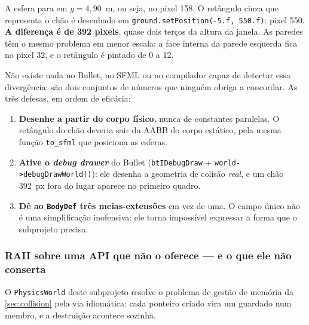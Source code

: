 A esfera para em $y = 4{,}90$~m, ou seja, no pixel 158. O retângulo cinza que
representa o chão é desenhado em \texttt{ground.setPosition(-5.f, 550.f)}:
pixel 550. \textbf{A diferença é de 392 pixels}, quase dois terços da altura da
janela. As paredes têm o mesmo problema em menor escala: a face interna da
parede esquerda fica no pixel 32, e o retângulo é pintado de 0 a 12.

\begin{armadilha}
Não existe nada no Bullet, no SFML ou no compilador capaz de detectar essa
divergência: são dois conjuntos de números que ninguém obriga a concordar. As
três defesas, em ordem de eficácia:
\begin{enumerate}
  \item \textbf{Desenhe a partir do corpo físico}, nunca de constantes
        paralelas. O retângulo do chão deveria sair da AABB do corpo estático,
        pela mesma função \texttt{to\_sfml} que posiciona as esferas.
  \item \textbf{Ative o \emph{debug drawer}} do Bullet
        (\texttt{btIDebugDraw} + \texttt{world->debugDrawWorld()}): ele desenha
        a geometria de colisão \emph{real}, e um chão 392~px fora do lugar
        aparece no primeiro quadro.
  \item \textbf{Dê ao \texttt{BodyDef} três meias-extensões} em vez de uma. O
        campo único não é uma simplificação inofensiva: ele torna impossível
        expressar a forma que o subprojeto precisa.
\end{enumerate}
\end{armadilha}

\subsubsection{RAII sobre uma API que não o oferece --- e o que ele não conserta}
\label{sec:sfml-bullet-raii}

O \texttt{PhysicsWorld} deste subprojeto resolve o problema de gestão de memória
da \cref{sec:collision} pela via idiomática: cada ponteiro criado vira um
 guardado num membro, e a destruição acontece sozinha.

